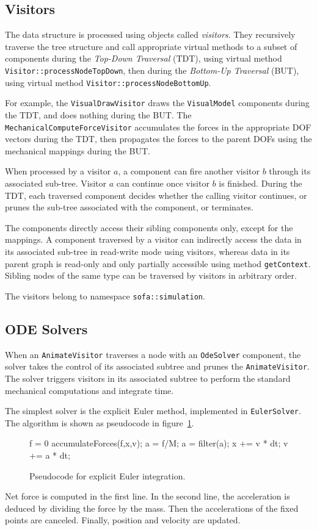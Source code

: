 \subsection{Visitors}
The data structure is processed using objects called \emph{visitors}.
They recursively traverse the tree structure and call appropriate virtual methods to a subset of components during the \textit{Top-Down Traversal} (TDT), using virtual method \texttt{Visitor::processNodeTopDown}, then during the \textit{Bottom-Up Traversal} (BUT), using virtual method \texttt{Visitor::processNodeBottomUp}.

For example, the \texttt{VisualDrawVisitor} draws the \texttt{VisualModel} components during the TDT, and does nothing during the BUT.
The \texttt{MechanicalComputeForceVisitor} accumulates the forces in the appropriate DOF vectors during the TDT, then propagates the forces to the parent DOFs using the mechanical mappings during the BUT.

When processed by a visitor $a$, a component can fire another visitor $b$ through its associated sub-tree. 
Visitor $a$ can continue once visitor $b$ is finished.
During the TDT, each traversed component decides whether the calling visitor continues, or prunes the sub-tree associated with the component, or terminates.

The components directly access their sibling components only, except for the mappings.
A component traversed by a visitor can indirectly access the data in its associated sub-tree in read-write mode using visitors, whereas data in its parent graph is read-only and only partially accessible using method \texttt{getContext}.
Sibling nodes of the same type can be traversed by visitors in arbitrary order.

The visitors belong to namespace \texttt{sofa::simulation}.

\subsection{ODE Solvers}
When an \texttt{AnimateVisitor} traverses a node with an \texttt{OdeSolver} component,
the solver takes the control of its associated subtree and prunes the \texttt{AnimateVisitor}. 
The solver triggers visitors in its associated subtree to perform the standard mechanical computations and integrate time.

The simplest solver is the explicit Euler method, implemented in \texttt{EulerSolver}. 
The algorithm is shown as pseudocode in figure~\ref{pc:expliciteuler}.
\begin{figure}
\begin{code_cpp}
f = 0
accumulateForces(f,x,v);
a = f/M;
a = filter(a);
x += v * dt;
v += a * dt;
\end{code_cpp}
\caption{Pseudocode for explicit Euler integration.}
\label{pc:expliciteuler}
\end{figure}
Net force is computed in the first line.
In the second line, the acceleration is deduced by dividing the force by the mass.
Then the accelerations of the fixed points are canceled.
Finally, position and velocity are updated.

